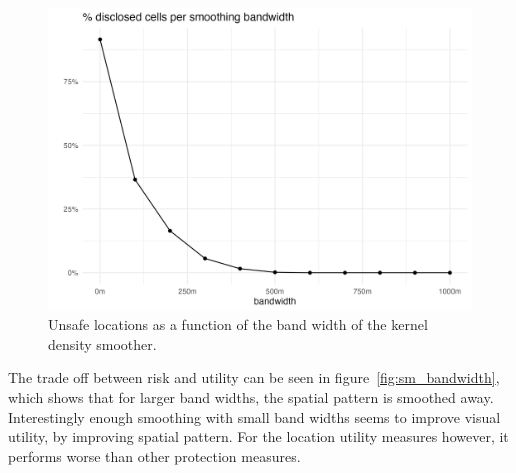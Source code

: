 \begin{figure}[H]
    \centering
    \includegraphics[width=.8\linewidth]{figures/Smoothing/sensitive_dep.png} 
    \caption{Unsafe locations as a function of the band width of the kernel density smoother.}
    \label{fig:sm_sensitive_bw}
\end{figure}

The trade off between risk and utility can be seen in figure~\ref{fig:sm_bandwidth}, which shows that for larger band widths, the spatial pattern is smoothed away. Interestingly enough smoothing with small band widths seems to improve visual utility, by improving spatial pattern. For the location utility measures however, it performs worse than 
other protection measures.

